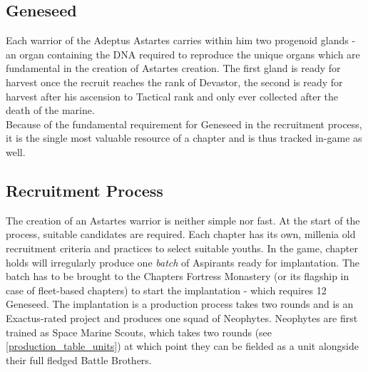 \subsection{Geneseed}
Each warrior of the Adeptus Astartes carries within him two progenoid glands - an organ containing the DNA required to reproduce the unique organs which are fundamental in the creation of Astartes creation. 
The first gland is ready for harvest once the recruit reaches the rank of Devastor, the second is ready for harvest after his ascension to Tactical rank and only ever collected after the death of the marine.\\
Because of the fundamental requirement for Geneseed in the recruitment process, it is the single most valuable resource of a chapter and is thus tracked in-game as well.

\subsection{Recruitment Process}
The creation of an Astartes warrior is neither simple nor fast. At the start of the process, suitable candidates are required. Each chapter has its own, millenia old recruitment criteria and practices to select suitable youths. 
In the game, chapter holds will irregularly produce one \textit{batch} of Aspirants ready for implantation.
The batch has to be brought to the Chapters Fortress Monastery (or its flagship in case of fleet-based chapters) to start the implantation - which requires 12 Geneseed.
The implantation is a production process takes two rounds and is an Exactus-rated project and produces one squad of Neophytes.
Neophytes are first trained as Space Marine Scouts, which takes two rounds (see \ref{production_table_units}) at which point they can be fielded as a unit alongside their full fledged Battle Brothers.\\

